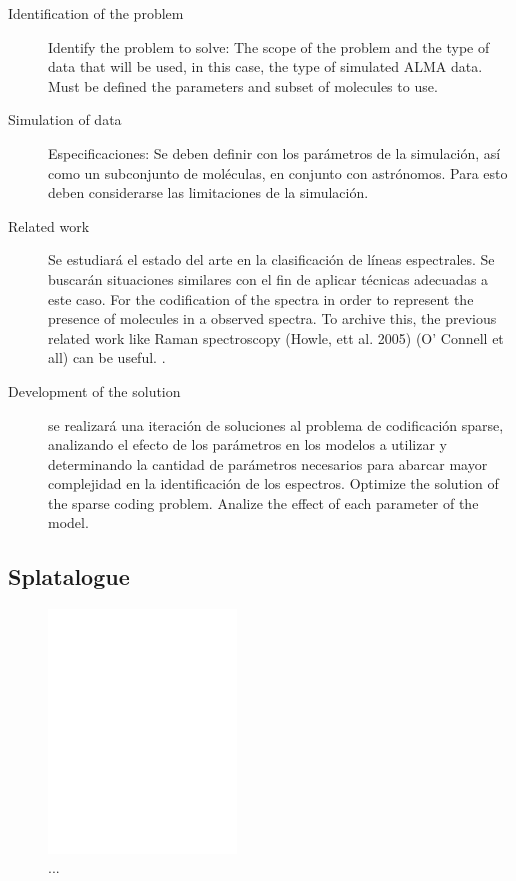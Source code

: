 \documentclass[twocolumn, draft]{emulateapj}
\begin{document}
\begin{description}
	\item [Identification of the problem] Identify the problem to solve: The scope of the problem and the type of data that will be used, in this case, the type of simulated ALMA data. Must be defined the parameters and subset of molecules to use.
	
	\item [Simulation of data] Especificaciones: Se deben definir con los parámetros de la simulación, así como un subconjunto de moléculas, en conjunto con astrónomos. Para esto deben considerarse las limitaciones de la simulación.
	
	\item [Related work] Se estudiará el estado del arte en la clasificación de líneas espectrales. Se buscarán situaciones similares con el fin de aplicar técnicas adecuadas a este caso. For the codification of the spectra in order to represent the presence of molecules in a observed spectra. To archive this, the previous related work like Raman spectroscopy (Howle, ett al. 2005) (O' Connell et all) can be useful. \citep{howley_effect_2005}.
	
	\item [Development of the solution] se realizará una iteración de soluciones al problema de codificación sparse, analizando el efecto de los parámetros en los modelos a utilizar y determinando la cantidad de parámetros necesarios para abarcar mayor complejidad en la identificación de los espectros. Optimize the solution of the sparse coding problem. Analize the effect of each parameter of the model.
	
\end{description}


\subsection{Splatalogue}

\begin{figure}[ht]
	\centering
	\includegraphics[width=5cm]{figs/fig1.pdf}
	\caption{...}
	\label{fig:fig1}
\end{figure}
\end{document}
